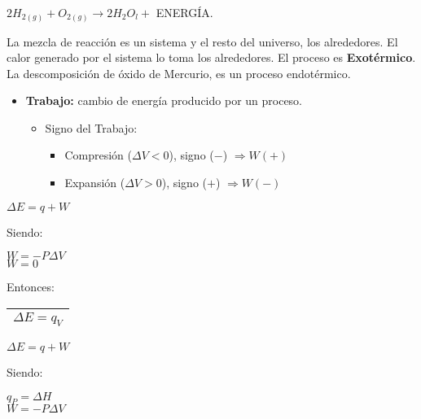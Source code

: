         \begin{center} 
            $2H_{2(g)} + O_{2(g)} \rightarrow 2H_2O_{l} +$ ENERGÍA. 
        \end{center}
        \sangria{} La mezcla de reacción es un sistema y el resto del universo, los alrededores. El calor generado por el sistema lo toma los alrededores. El proceso es \textbf{Exotérmico}.
        \sangria{} La descomposición de óxido de Mercurio, es un proceso endotérmico.
        \begin{itemize}
            \item \textbf{Trabajo:} cambio de energía producido por un proceso.
            \begin{itemize}
                \item Signo del Trabajo:
                    \begin{itemize}
                        \item Compresión ($\Delta V < 0$), signo ($-$) $\Rightarrow W (+)$
                        \item Expansión ($\Delta V > 0$), signo ($+$) $\Rightarrow W(-)$
                    \end{itemize}
            \end{itemize}
        \end{itemize}
        \begin{center} $\Delta E = q + W$ \\[5pt] \end{center}
        Siendo:
        \begin{center} $W = - P \Delta V$ \\[5pt] $W = 0$ \end{center}
        Entonces:
        \begin{center}
            \begin{tabular}{| c |}
                \hline 
                $\Delta E = q_V$ \\ 
                \hline 
            \end{tabular} 
        \end{center}
        \begin{center} $\Delta E = q + W$ \end{center}
        Siendo:
        \begin{center}
            $q_P = \Delta H$ \\[5pt]
            $W = -P \Delta V$
        \end{center}
